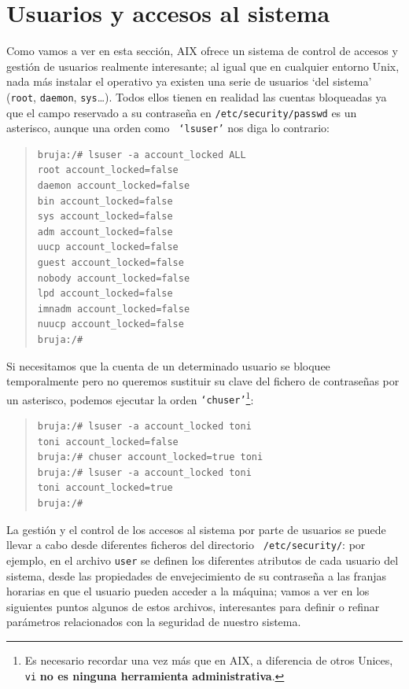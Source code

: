 \section{Usuarios y accesos al sistema}
Como vamos a ver en esta secci\'on, AIX ofrece un sistema de control de accesos 
y gesti\'on de usuarios realmente interesante; al igual que en cualquier entorno
Unix, nada m\'as instalar el operativo ya existen una serie de usuarios `del
sistema' ({\tt root}, {\tt daemon}, {\tt sys}\ldots). Todos ellos tienen en 
realidad las cuentas bloqueadas ya que el campo reservado a su contrase\~na en
{\tt /etc/security/passwd} es un asterisco, aunque una orden como {\tt
`lsuser'} nos diga lo contrario: 
\begin{quote}
\begin{verbatim}
bruja:/# lsuser -a account_locked ALL
root account_locked=false 
daemon account_locked=false 
bin account_locked=false 
sys account_locked=false 
adm account_locked=false 
uucp account_locked=false 
guest account_locked=false 
nobody account_locked=false 
lpd account_locked=false
imnadm account_locked=false 
nuucp account_locked=false 
bruja:/#
\end{verbatim}
\end{quote}
Si necesitamos que la cuenta de un determinado usuario se bloquee temporalmente
pero no queremos sustituir su clave del fichero de contrase\~nas por un
asterisco, podemos ejecutar
la orden {\tt `chuser'}\footnote{Es necesario recordar una vez m\'as que en 
AIX, a diferencia de otros Unices, {\tt vi} {\bf no es ninguna herramienta 
administrativa}.}:
\begin{quote}
\begin{verbatim}
bruja:/# lsuser -a account_locked toni
toni account_locked=false 
bruja:/# chuser account_locked=true toni
bruja:/# lsuser -a account_locked toni
toni account_locked=true 
bruja:/# 
\end{verbatim}
\end{quote}
La gesti\'on y el control de los accesos al sistema por parte de usuarios se
puede llevar a cabo desde diferentes ficheros del directorio {\tt 
/etc/security/}: por ejemplo, en el archivo {\tt user} se definen los diferentes
atributos de cada usuario del sistema, desde las propiedades de envejecimiento
de su contrase\~na a las franjas horarias en que el usuario pueden acceder a 
la m\'aquina; vamos a ver en los siguientes puntos algunos de estos archivos,
interesantes para definir o refinar par\'ametros relacionados con la seguridad
de nuestro sistema.
